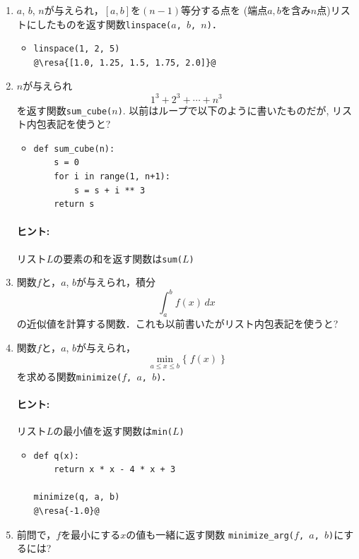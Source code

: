 \documentclass[10pt,dvipdfmx]{article}
\newcommand{\resa}[1]{ {\textsl{$\rightarrow$ #1}}}
\begin{document}
\begin{enumerate}
\item $a$, $b$, $n$が与えられ，$[a, b]$を$(n-1)$等分する点を
(端点$a, b$を含み$n$点)リストにしたものを返す関数{\tt linspace($a$, $b$, $n$)}．

\begin{itemize}
\item []
\begin{lstlisting}
linspace(1, 2, 5)
@\resa{[1.0, 1.25, 1.5, 1.75, 2.0]}@
\end{lstlisting}
\end{itemize}

\item $n$が与えられ
\[ 1^3 + 2^3 + \cdots + n^3 \]
を返す関数{\tt sum\_cube($n$)}.
以前はループで以下のように書いたものだが, リスト内包表記を使うと?

\begin{itemize}
\item []
\begin{lstlisting}
def sum_cube(n):
    s = 0
    for i in range(1, n+1):
        s = s + i ** 3
    return s
\end{lstlisting}
\end{itemize}

\paragraph{ヒント:} リスト$L$の要素の和を返す関数は{\tt sum($L$)}

\item 関数$f$と，$a$, $b$が与えられ，積分
\[ \int_a^b f(x)\, dx \]
の近似値を計算する関数．これも以前書いたがリスト内包表記を使うと?

\item 関数$f$と，$a$, $b$が与えられ，
\[ \min_{a\leq x \leq b} \{\; f(x)\; \} \]
を求める関数{\tt minimize($f$, $a$, $b$)}．
\paragraph{ヒント:} リスト$L$の最小値を返す関数は{\tt min($L$)}
\begin{itemize}
\item []
\begin{lstlisting}
def q(x):
    return x * x - 4 * x + 3

minimize(q, a, b)
@\resa{-1.0}@
\end{lstlisting}
\end{itemize}

\item 前問で，$f$を最小にする$x$の値も一緒に返す関数
{\tt minimize\_arg($f$, $a$, $b$)}にするには?

\end{enumerate}
\end{document}
